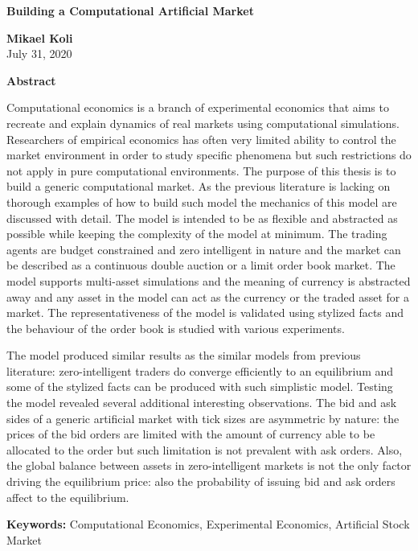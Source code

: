 \thispagestyle{plain}
\begin{center}
    \Large
    \textbf{Building a Computational Artificial Market}
        
    \vspace{0.4cm}
    \large
        
    \vspace{0.4cm}
    \textbf{Mikael Koli} \\
    July 31, 2020 %
       
    \vspace{0.9cm}
    \textbf{Abstract}
\end{center}

Computational economics is a branch of experimental economics that aims to 
recreate and explain dynamics of real markets using computational simulations. Researchers of
empirical economics has often very limited ability to control the market environment 
in order to study specific phenomena but such restrictions do not apply in pure computational
environments. The purpose of this thesis is to build a generic computational market. As the
previous literature is lacking on thorough examples of how to build such model the mechanics of this
model are discussed with detail. The model is intended to be as flexible and abstracted as possible 
while keeping the complexity of the model at minimum. The trading agents are budget constrained 
and zero intelligent in nature and the market can be described as a continuous double auction or a 
limit order book market. The model supports multi-asset simulations and the meaning of currency is 
abstracted away and any asset in the model can act as the currency or the traded asset for a market. 
The representativeness of the model is validated using stylized facts and the behaviour
of the order book is studied with various experiments.

The model produced similar results as the similar models from previous literature: zero-intelligent
traders do converge efficiently to an equilibrium and some of the stylized facts can be produced
with such simplistic model. Testing the model revealed several additional interesting observations.
The bid and ask sides of a generic artificial market with tick sizes are asymmetric by nature: the 
prices of the bid orders are limited with the amount of currency able to be allocated to the order 
but such limitation is not prevalent with ask orders. Also, the global balance between assets in 
zero-intelligent markets is not the only factor driving the equilibrium price: also the probability 
of issuing bid and ask orders affect to the equilibrium.

\textbf{Keywords:} Computational Economics, Experimental Economics, Artificial Stock Market